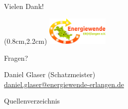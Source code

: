\begin{frame}{Vielen Dank!}

   \begin{textblock*}{3cm}(0.8cm,2.2cm)  %
      \includegraphics[width=3cm]{images/Logo_EWERH_eV_small.png}
   \end{textblock*}
   \vspace{2.5cm}
   \begin{center}
      \Huge Fragen?
   \end{center}
   \vfill
   \begin{minipage}{0.20\textwidth}
      \centering
   \end{minipage}
   \hfill
   \begin{minipage}{0.75\textwidth}
      \begin{flushright}
         \footnotesize Daniel Glaser (Schatzmeister) \\
         \href{mailto:daniel.glaser@energiewende-erlangen.de}{daniel.glaser@energiewende-erlangen.de}
      \end{flushright}
   \end{minipage}%
\end{frame}

\usebackgroundtemplate{}
\begin{frame}[allowframebreaks]{Quellenverzeichnis}
   \begingroup
      \renewcommand{\bibfont}{\scriptsize} %
      \printbibliography[heading=none]
   \endgroup
\end{frame}